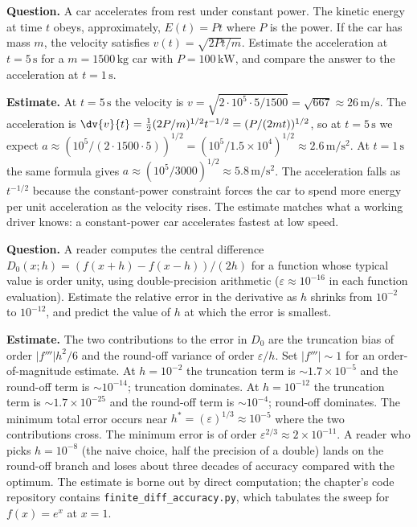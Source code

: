 \begin{estimation}
\textbf{Question.} A car accelerates from rest under constant
power. The kinetic energy at time $t$ obeys, approximately,
$E(t) = P t$ where $P$ is the power. If the car has mass $m$, the
velocity satisfies $v(t) = \sqrt{2 P t / m}$. Estimate the
acceleration at $t = 5\,\si{\second}$ for a $m = 1500\,\si{\kg}$
car with $P = 100\,\si{\kilo\watt}$, and compare the answer to the
acceleration at $t = 1\,\si{\second}$.

\textbf{Estimate.} At $t = 5\,\si{\second}$ the velocity is
$v = \sqrt{2 \cdot 10^{5} \cdot 5 / 1500} = \sqrt{667} \approx
26\,\si{\meter\per\second}$. The acceleration is
$\dv{v}{t} = \tfrac{1}{2}(2 P / m)^{1/2} t^{-1/2} = (P / (2 m
t))^{1/2}$, so at $t = 5\,\si{\second}$ we expect
$a \approx (10^{5} / (2 \cdot 1500 \cdot 5))^{1/2} = (10^{5} / 1.5
\times 10^{4})^{1/2} \approx 2.6\,\si{\meter\per\second\squared}$.
At $t = 1\,\si{\second}$ the same formula gives $a \approx
(10^{5} / 3000)^{1/2} \approx 5.8\,\si{\meter\per\second\squared}$.
The acceleration falls as $t^{-1/2}$ because the constant-power
constraint forces the car to spend more energy per unit
acceleration as the velocity rises. The estimate matches what a
working driver knows: a constant-power car accelerates fastest at
low speed.
\end{estimation}

\begin{estimation}
\textbf{Question.} A reader computes the central difference
$D_{0}(x; h) = (f(x + h) - f(x - h)) / (2 h)$ for a function whose
typical value is order unity, using double-precision arithmetic
($\varepsilon \approx 10^{-16}$ in each function evaluation).
Estimate the relative error in the derivative as $h$ shrinks from
$10^{-2}$ to $10^{-12}$, and predict the value of $h$ at which the
error is smallest.

\textbf{Estimate.} The two contributions to the error in $D_{0}$
are the truncation bias of order $|f'''| h^{2} / 6$ and the
round-off variance of order $\varepsilon / h$. Set $|f'''| \sim 1$
for an order-of-magnitude estimate. At $h = 10^{-2}$ the truncation
term is $\sim 1.7 \times 10^{-5}$ and the round-off term is
$\sim 10^{-14}$; truncation dominates. At $h = 10^{-12}$ the
truncation term is $\sim 1.7 \times 10^{-25}$ and the round-off
term is $\sim 10^{-4}$; round-off dominates. The minimum total
error occurs near $h^{*} = (\varepsilon)^{1/3} \approx 10^{-5}$
where the two contributions cross. The minimum error is of order
$\varepsilon^{2/3} \approx 2 \times 10^{-11}$. A reader who picks
$h = 10^{-8}$ (the naive choice, half the precision of a
double) lands on the round-off branch and loses about three
decades of accuracy compared with the optimum. The estimate is
borne out by direct computation; the chapter's code repository
contains \texttt{finite\_diff\_accuracy.py}, which tabulates the
sweep for $f(x) = e^{x}$ at $x = 1$.
\end{estimation}

